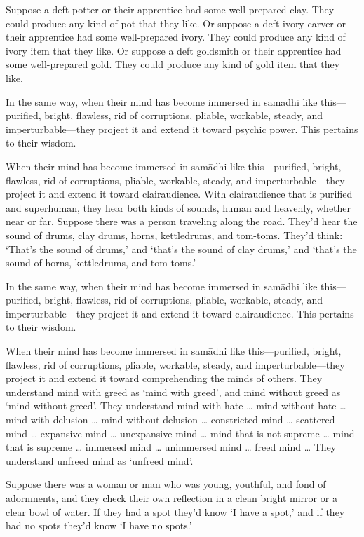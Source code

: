 \documentclass[12pt,openany]{book}%
\begin{document}
Suppose a deft potter or their apprentice had some well-prepared clay. They could produce any kind of pot that they like. Or suppose a deft ivory-carver or their apprentice had some well-prepared ivory. They could produce any kind of ivory item that they like. Or suppose a deft goldsmith or their apprentice had some well-prepared gold. They could produce any kind of gold item that they like. 

In the same way, when their mind has become immersed in \textsanskrit{samādhi} like this—purified, bright, flawless, rid of corruptions, pliable, workable, steady, and imperturbable—they project it and extend it toward psychic power. This pertains to their wisdom. 

When their mind has become immersed in \textsanskrit{samādhi} like this—purified, bright, flawless, rid of corruptions, pliable, workable, steady, and imperturbable—they project it and extend it toward clairaudience. With clairaudience that is purified and superhuman, they hear both kinds of sounds, human and heavenly, whether near or far. Suppose there was a person traveling along the road. They’d hear the sound of drums, clay drums, horns, kettledrums, and tom-toms. They’d think: ‘That’s the sound of drums,’ and ‘that’s the sound of clay drums,’ and ‘that’s the sound of horns, kettledrums, and tom-toms.’ 

In the same way, when their mind has become immersed in \textsanskrit{samādhi} like this—purified, bright, flawless, rid of corruptions, pliable, workable, steady, and imperturbable—they project it and extend it toward clairaudience. This pertains to their wisdom. 

When their mind has become immersed in \textsanskrit{samādhi} like this—purified, bright, flawless, rid of corruptions, pliable, workable, steady, and imperturbable—they project it and extend it toward comprehending the minds of others. They understand mind with greed as ‘mind with greed’, and mind without greed as ‘mind without greed’. They understand mind with hate … mind without hate … mind with delusion … mind without delusion … constricted mind … scattered mind … expansive mind … unexpansive mind … mind that is not supreme … mind that is supreme … immersed mind … unimmersed mind … freed mind … They understand unfreed mind as ‘unfreed mind’. 

Suppose there was a woman or man who was young, youthful, and fond of adornments, and they check their own reflection in a clean bright mirror or a clear bowl of water. If they had a spot they’d know ‘I have a spot,’ and if they had no spots they’d know ‘I have no spots.’ 
\end{document}
